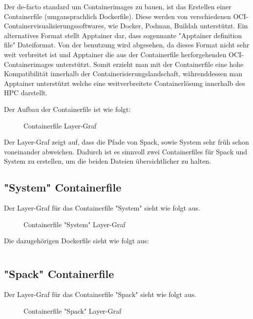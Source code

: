 Der de-facto standard um Containerimages zu bauen, ist das Erstellen einer Containerfile (umgansprachlich Dockerfile). Diese werden von verschiedenen OCI-Containervisualisierungssoftwares, wie Docker, Podman, Buildah unterstützt. Ein alternatives Format stellt Apptainer dar, dass sogennante "Apptainer definition file" Dateiformat. Von der benutzung wird abgesehen, da dieses Format nicht sehr weit verbreitet ist und Apptainer die aus der Containerfile herforgehenden OCI-Containerimages unterstützt. Somit erzieht man mit der Containerfile eine hohe Kompatibilität innerhalb der Containerisierungslandschaft, währenddessen man Apptainer unterstützt welche eine weitverbreitete Containerlösung innerhalb des HPC darstellt. 

Der Aufbau der Containerfile ist wie folgt:

\begin{figure}[!htbp]
    \centering
    
    \caption{Containerfile Layer-Graf}
\end{figure}

\FloatBarrier

Der Layer-Graf zeigt auf, dass die Pfade von Spack, sowie System sehr früh schon voneinander abweichen. Dadurch ist es sinnvoll zwei Containerfiles für Spack und System zu erstellen, um die beiden Dateien übersichtlicher zu halten. 

\subsection{"System" Containerfile}

Der Layer-Graf für das Containerfile "System" sieht wie folgt aus. 
\begin{figure}[!htbp]
    \centering
    
    \caption{Containerfile "System" Layer-Graf}
\end{figure}

Die dazugehörigen Dockerfile sieht wie folgt aus: 

\inputminted{dockerfile}{./code-examples/Dockerfile.system}

\subsection{"Spack" Containerfile}
Der Layer-Graf für das Containerfile "Spack" sieht wie folgt aus.
\begin{figure}[!htbp]
    \centering
    
    \caption{Containerfile "Spack" Layer-Graf}
\end{figure}

